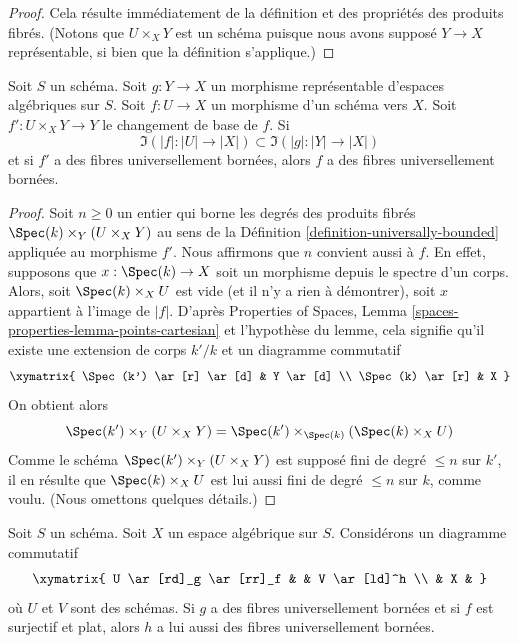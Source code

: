 \begin{proof}
Cela résulte immédiatement de la définition et des propriétés des produits
fibrés. (Notons que $U \times_X Y$ est un schéma puisque nous avons supposé
$Y \to X$ représentable, si bien que la définition s'applique.)
\end{proof}

\begin{lemma}
\label{lemma-descent-universally-bounded}
Soit $S$ un schéma. Soit $g : Y \to X$ un morphisme représentable d'espaces
algébriques sur $S$. Soit $f : U \to X$ un morphisme d'un schéma vers $X$.
Soit $f' : U \times_X Y \to Y$ le changement de base de $f$.
Si
$$
\Im(|f| : |U| \to |X|) \subset \Im(|g| : |Y| \to |X|)
$$
et si $f'$ a des fibres universellement bornées, alors $f$ a des fibres
universellement bornées.
\end{lemma}

\begin{proof}
Soit $n \geq 0$ un entier qui borne les degrés des produits fibrés
$\Spec(k) \times_Y (U \times_X Y)$ au sens de la
Définition \ref{definition-universally-bounded} appliquée au morphisme $f'$.
Nous affirmons que $n$ convient aussi à $f$. En effet, supposons que
$x : \Spec(k) \to X$ soit un morphisme depuis le spectre d'un corps.
Alors, soit $\Spec(k) \times_X U$ est vide (et il n'y a rien à démontrer),
soit $x$ appartient à l'image de $|f|$. D'après
Properties of Spaces,
Lemma \ref{spaces-properties-lemma-points-cartesian}
et l'hypothèse du lemme, cela signifie qu'il existe une extension de corps
$k'/k$ et un diagramme commutatif
$$
\xymatrix{
\Spec(k') \ar[r] \ar[d] & Y \ar[d] \\
\Spec(k) \ar[r] & X
}
$$
On obtient alors
$$
\Spec(k') \times_Y (U \times_X Y) =
\Spec(k') \times_{\Spec(k)} (\Spec(k) \times_X U)
$$
Comme le schéma $\Spec(k') \times_Y (U \times_X Y)$ est supposé fini de degré
$\leq n$ sur $k'$, il en résulte que $\Spec(k) \times_X U$ est lui aussi fini
de degré $\leq n$ sur $k$, comme voulu. (Nous omettons quelques détails.)
\end{proof}

\begin{lemma}
\label{lemma-universally-bounded-permanence}
Soit $S$ un schéma. Soit $X$ un espace algébrique sur $S$.
Considérons un diagramme commutatif
$$
\xymatrix{
U \ar[rd]_g \ar[rr]_f & & V \ar[ld]^h \\
& X &
}
$$
où $U$ et $V$ sont des schémas. Si $g$ a des fibres universellement bornées
et si $f$ est surjectif et plat, alors $h$ a lui aussi des fibres
universellement bornées.
\end{lemma}

